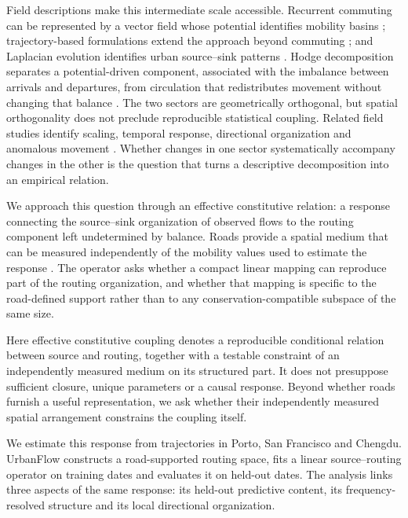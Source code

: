 \documentclass[11pt]{article}
\begin{document}
Field descriptions make this intermediate scale accessible. Recurrent commuting can be represented by a vector field whose potential identifies mobility basins \cite{mazzoli2019field}; trajectory-based formulations extend the approach beyond commuting \cite{liu2024generalized}; and Laplacian evolution identifies urban source--sink patterns \cite{zhang2024laplacian}. Hodge decomposition separates a potential-driven component, associated with the imbalance between arrivals and departures, from circulation that redistributes movement without changing that balance \cite{aoki2022hodge,du2026landscapes}. The two sectors are geometrically orthogonal, but spatial orthogonality does not preclude reproducible statistical coupling. Related field studies identify scaling, temporal response, directional organization and anomalous movement \cite{shida2020scaling,shida2022potential,zhao2024directionality,yang2023vector}. Whether changes in one sector systematically accompany changes in the other is the question that turns a descriptive decomposition into an empirical relation.

We approach this question through an effective constitutive relation: a response connecting the source--sink organization of observed flows to the routing component left undetermined by balance. Roads provide a spatial medium that can be measured independently of the mobility values used to estimate the response \cite{barthelemy2011,kirkley2018,boeing2019,ewing2010travel,sharmin2018}. The operator asks whether a compact linear mapping can reproduce part of the routing organization, and whether that mapping is specific to the road-defined support rather than to any conservation-compatible subspace of the same size.

Here effective constitutive coupling denotes a reproducible conditional relation between source and routing, together with a testable constraint of an independently measured medium on its structured part. It does not presuppose sufficient closure, unique parameters or a causal response. Beyond whether roads furnish a useful representation, we ask whether their independently measured spatial arrangement constrains the coupling itself.

We estimate this response from trajectories in Porto, San Francisco and Chengdu. UrbanFlow constructs a road-supported routing space, fits a linear source--routing operator on training dates and evaluates it on held-out dates. The analysis links three aspects of the same response: its held-out predictive content, its frequency-resolved structure and its local directional organization.
\end{document}
